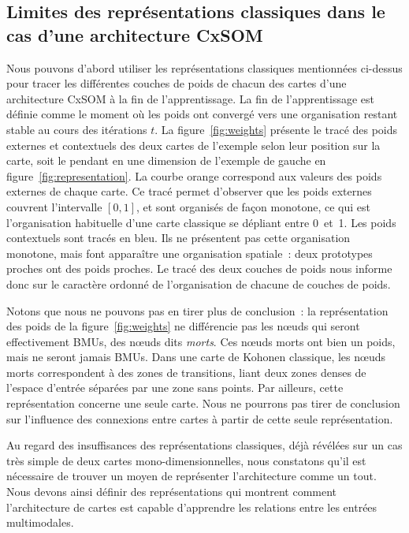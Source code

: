 \documentclass[../main]{subfiles}
\begin{document}
\subsection{Limites des représentations classiques dans le cas d'une architecture CxSOM}


Nous pouvons d'abord utiliser les représentations classiques mentionnées ci-dessus pour tracer les différentes couches de poids de chacun des cartes d'une architecture CxSOM à la fin de l'apprentissage.
La fin de l'apprentissage est définie comme le moment où les poids ont convergé vers une organisation restant stable au cours des itérations $t$.
La figure~\ref{fig:weights} présente le tracé des poids externes et contextuels des deux cartes de l'exemple selon leur position sur la carte, soit le pendant en une dimension de l'exemple de gauche en figure~\ref{fig:representation}.
La courbe orange correspond aux valeurs des poids externes de chaque carte.
Ce tracé permet d'observer que les poids externes couvrent l'intervalle $[0,1]$, et sont organisés de façon monotone, ce qui est l'organisation habituelle d'une carte classique se dépliant entre 0~et~1.
Les poids contextuels sont tracés en bleu. Ils ne présentent pas cette organisation monotone, mais font apparaître une organisation spatiale~: deux prototypes proches ont des poids proches. 
Le tracé des deux couches de poids nous informe donc sur le caractère ordonné de l'organisation de chacune de couches de poids. 

Notons que nous ne pouvons pas en tirer plus de conclusion~: la représentation des poids de la figure~\ref{fig:weights} ne différencie pas les n\oe{}uds qui seront effectivement BMUs, des n\oe{}uds dits \emph{morts}.
Ces n\oe{}uds morts ont bien un poids, mais ne seront jamais BMUs.
Dans une carte de Kohonen classique, les n\oe{}uds morts correspondent à des zones de transitions, liant deux zones denses de l'espace d'entrée séparées par une zone sans points.
Par ailleurs, cette représentation concerne une seule carte. Nous ne pourrons pas tirer de conclusion sur l'influence des connexions entre cartes à partir de cette seule représentation.

Au regard des insuffisances des représentations classiques, déjà révélées sur un cas très simple de deux cartes mono-dimensionnelles, nous constatons qu'il est nécessaire de trouver un moyen de représenter l'architecture comme un tout. Nous devons ainsi définir des représentations qui montrent comment l'architecture de cartes est capable d'apprendre les relations entre les entrées multimodales.
\end{document}
